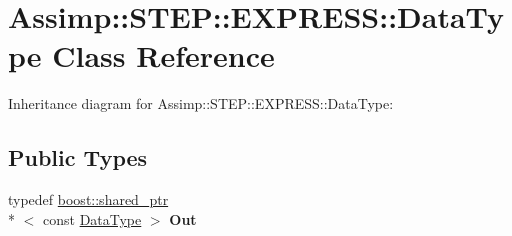 \hypertarget{class_assimp_1_1_s_t_e_p_1_1_e_x_p_r_e_s_s_1_1_data_type}{\section{Assimp\+:\+:S\+T\+E\+P\+:\+:E\+X\+P\+R\+E\+S\+S\+:\+:Data\+Type Class Reference}
\label{class_assimp_1_1_s_t_e_p_1_1_e_x_p_r_e_s_s_1_1_data_type}
}


Inheritance diagram for Assimp\+:\+:S\+T\+E\+P\+:\+:E\+X\+P\+R\+E\+S\+S\+:\+:Data\+Type\+:
\subsection*{Public Types}
\begin{DoxyCompactItemize}
\item 
\hypertarget{class_assimp_1_1_s_t_e_p_1_1_e_x_p_r_e_s_s_1_1_data_type_a230832b05e5e48b2d50a0f431ca705cb}{typedef \hyperlink{classboost_1_1shared__ptr}{boost\+::shared\+\_\+ptr}\\*
$<$ const \hyperlink{class_assimp_1_1_s_t_e_p_1_1_e_x_p_r_e_s_s_1_1_data_type}{Data\+Type} $>$ {\bfseries Out}}\label{class_assimp_1_1_s_t_e_p_1_1_e_x_p_r_e_s_s_1_1_data_type_a230832b05e5e48b2d50a0f431ca705cb}

\end{DoxyCompactItemize}
